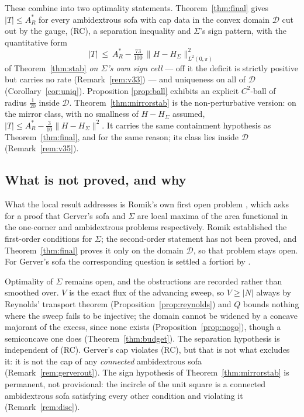 \documentclass[11pt]{article}
\theoremstyle{definition}
\newcommand{\Sig}{\Sigma}
\begin{document}
These combine into two optimality statements. Theorem~\ref{thm:final} gives
$|T|\le A_R^\ast$ for every ambidextrous sofa with cap data in the convex domain
$\mathcal D$ cut out by the gauge, (RC), a separation inequality and $\Sig$'s sign
pattern, with the quantitative form
\[
  |T|\ \le\ A_R^\ast-\tfrac{73}{100}\,\|H-H_\Sig\|^2_{L^2(0,\pi)}
\]
of Theorem~\ref{thm:stab} \emph{on $\Sig$'s own sign cell} --- off it the deficit is
strictly positive but carries no rate (Remark~\ref{rem:v33}) --- and uniqueness on all of
$\mathcal D$ (Corollary~\ref{cor:uniq}). Proposition
\ref{prop:ball} exhibits an explicit $C^2$-ball of radius $\tfrac1{20}$ inside
$\mathcal D$. Theorem~\ref{thm:mirrorstab} is the non-perturbative version: on the mirror
class, with no smallness of $H-H_\Sig$ assumed, $|T|\le A_R^\ast-\tfrac3{10}\|H-H_\Sig\|^2$.
It carries the same containment hypothesis as Theorem~\ref{thm:final}, and for the same
reason; its class lies inside $\mathcal D$ (Remark~\ref{rem:v35}).

\subsection*{What is not proved, and why}

What the local result addresses is Romik's own first open problem \cite[\S7]{Rom18}, which
asks for a proof that Gerver's sofa and $\Sig$ are local maxima of the area functional in
the one-corner and ambidextrous problems respectively. Romik established the first-order
conditions for $\Sig$; the second-order statement has not been proved, and
Theorem~\ref{thm:final} proves it only on the domain $\mathcal D$, so that problem stays
open. For Gerver's sofa the corresponding question is settled a fortiori by \cite{Bae24}.

Optimality of $\Sig$ remains open, and the obstructions are recorded rather than smoothed
over. $V$ is the exact flux of the advancing sweep, so $V\ge|N|$ always by Reynolds'
transport theorem (Proposition~\ref{prop:reynolds}) and $Q$ bounds nothing where the sweep
fails to be injective; the domain cannot be widened by a concave majorant of the excess,
since none exists (Proposition~\ref{prop:nogo}), though a semiconcave one does
(Theorem~\ref{thm:budget}). The separation hypothesis is independent of (RC). Gerver's cap
violates (RC), but that is not what excludes it: it is not the cap of any \emph{connected}
ambidextrous sofa (Remark~\ref{rem:gerverout}). The sign hypothesis of
Theorem~\ref{thm:mirrorstab} is permanent, not provisional: the incircle of the unit
square is a connected ambidextrous sofa satisfying every other condition and violating it
(Remark~\ref{rem:disc}).
\end{document}
